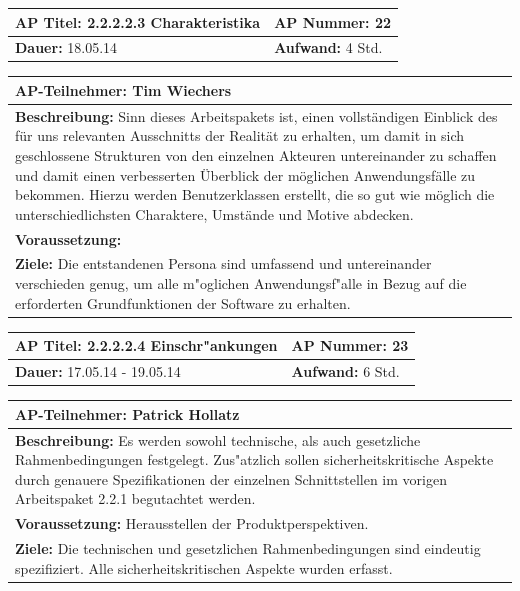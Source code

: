 \documentclass[fontsize=12pt,paper=a4,twoside]{scrartcl}
\begin{document}
\begin{tabular}{|p{7.43cm}|p{7.43cm}|}
\hline
\textbf{AP Titel: }2.2.2.2.3 Charakteristika & \textbf{AP Nummer: }22\\ 
\hline
\textbf{Dauer: }18.05.14 & \textbf{Aufwand: } 4 Std.\\
\hline
\end{tabular}
\begin{tabular}{|p{15.3cm}|}
\hline
\textbf{AP-Teilnehmer: }Tim Wiechers\\
\hline
\textbf{Beschreibung: }Sinn dieses Arbeitspakets ist, einen vollständigen Einblick des für uns relevanten Ausschnitts der Realität zu erhalten, um damit in sich geschlossene Strukturen von den einzelnen Akteuren untereinander zu schaffen und damit einen verbesserten Überblick der möglichen Anwendungsfälle zu bekommen. Hierzu werden Benutzerklassen erstellt, die so gut wie möglich die unterschiedlichsten Charaktere, Umstände und Motive abdecken.
\\
\hline
\textbf{Voraussetzung: }\\
\hline 
\textbf{Ziele: }Die entstandenen Persona sind umfassend und untereinander verschieden genug, um alle m"oglichen Anwendungsf"alle in Bezug auf die erforderten Grundfunktionen der Software zu erhalten.
\\
\hline 
\end{tabular}

\begin{tabular}{|p{7.43cm}|p{7.43cm}|}
\hline
\textbf{AP Titel: }2.2.2.2.4 Einschr"ankungen& \textbf{AP Nummer: }23\\ 
\hline
\textbf{Dauer: }17.05.14 - 19.05.14& \textbf{Aufwand: } 6 Std.\\
\hline
\end{tabular}
\begin{tabular}{|p{15.3cm}|}
\hline
\textbf{AP-Teilnehmer: }Patrick Hollatz\\
\hline
\textbf{Beschreibung: }Es werden sowohl technische, als auch gesetzliche Rahmenbedingungen festgelegt. Zus"atzlich sollen sicherheitskritische Aspekte durch genauere Spezifikationen der einzelnen Schnittstellen im vorigen Arbeitspaket 2.2.1 begutachtet werden.\\
\hline
\textbf{Voraussetzung: }Herausstellen der Produktperspektiven.\\
\hline 
\textbf{Ziele: }Die technischen und gesetzlichen Rahmenbedingungen sind eindeutig spezifiziert. Alle sicherheitskritischen Aspekte wurden erfasst.\\
\hline 
\end{tabular}
\end{document}
